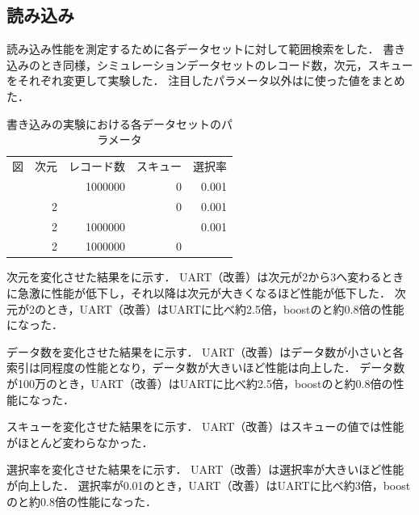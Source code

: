 \subsection{読み込み}

読み込み性能を測定するために各データセットに対して範囲検索をした．
書き込みのとき同様，シミュレーションデータセットのレコード数，次元，スキューをそれぞれ変更して実験した．
注目したパラメータ以外は\Tab{\ref{tab:rec}}に使った値をまとめた．
\begin{table}[tb]
  \caption{書き込みの実験における各データセットのパラメータ}
  \label{tab:rec}
  \centering \small
  \begin{tabular}{lrrrr}
    \toprule
    図                               & 次元 & レコード数 & スキュー & 選択率 \\
    \cmidrule(lr){1-1}
    \cmidrule(lr){2-2}
    \cmidrule(lr){3-3}
    \cmidrule(lr){4-4}
    \cmidrule(lr){5-5}
    \Fig{\ref{graph:dim-sc}}         & \-   & 1000000    & 0        & 0.001  \\
    \Fig{\ref{graph:rec-sc}}         & 2    & \-         & 0        & 0.001  \\
    \Fig{\ref{graph:skew-sc}}        & 2    & 1000000    & \-       & 0.001  \\
    \Fig{\ref{graph:selectivity-sc}} & 2    & 1000000    & 0        & \-     \\
    \bottomrule
  \end{tabular}
\end{table}

次元を変化させた結果を\Fig{\ref{graph:dim-sc}}に示す．
UART（改善）は次元が2から3へ変わるときに急激に性能が低下し，それ以降は次元が大きくなるほど性能が低下した．
次元が2のとき，UART（改善）はUARTに比べ約2.5倍，boostの\RTree と約0.8倍の性能になった．


データ数を変化させた結果を\Fig{\ref{graph:rec-sc}}に示す．
UART（改善）はデータ数が小さいと各索引は同程度の性能となり，データ数が大きいほど性能は向上した．
データ数が100万のとき，UART（改善）はUARTに比べ約2.5倍，boostの\RTree と約0.8倍の性能になった．


スキューを変化させた結果を\Fig{\ref{graph:skew-sc}}に示す．
UART（改善）はスキューの値では性能がほとんど変わらなかった．


選択率を変化させた結果を\Fig{\ref{graph:selectivity-sc}}に示す．
UART（改善）は選択率が大きいほど性能が向上した．
選択率が0.01のとき，UART（改善）はUARTに比べ約3倍，boostの\RTree と約0.8倍の性能になった．



